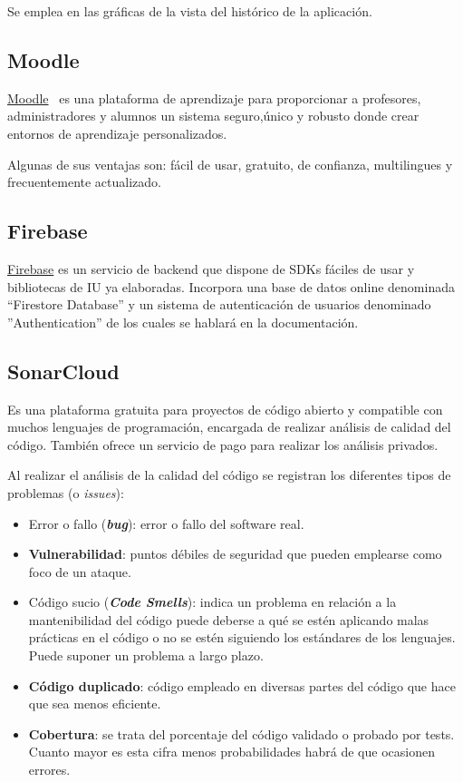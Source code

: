 Se emplea en las gráficas de la vista del histórico de la aplicación.

\subsection{Moodle}
\href{https://moodle.org/}{Moodle}~\cite{pagina_Moodle} es una plataforma de aprendizaje para proporcionar a profesores, administradores y alumnos un sistema seguro,único y robusto donde crear entornos de aprendizaje personalizados.

Algunas de sus ventajas son: fácil de usar, gratuito, de confianza, multilingues y frecuentemente actualizado.

\subsection{Firebase}
\href{https://firebase.google.com/}{Firebase} es un servicio de backend que dispone de SDKs fáciles de usar y bibliotecas de IU ya elaboradas. 
Incorpora una base de datos online denominada ``Firestore Database'' y un sistema de autenticación de usuarios denominado ''Authentication'' de los cuales se hablará en la documentación.

\subsection{SonarCloud}
Es una plataforma gratuita para proyectos de código abierto y compatible con muchos lenguajes de programación, encargada de realizar análisis de calidad del código. También ofrece un servicio de pago para realizar los análisis privados.

Al realizar el análisis de la calidad del código se registran los diferentes tipos de problemas (o \emph{issues}):
\begin{itemize}
	\tightlist
	\item Error o fallo (\textbf{\emph{bug}}): error o fallo del software real.   
	\item \textbf{Vulnerabilidad}: puntos débiles de seguridad que pueden emplearse como foco de un ataque.
	\item Código sucio (\textbf{\emph{Code Smells}}): indica un problema en relación a la mantenibilidad del código puede deberse a qué se estén aplicando malas prácticas en el código o no se estén siguiendo los estándares de los lenguajes. Puede suponer un problema a largo plazo.
	\item \textbf{Código duplicado}: código empleado en diversas partes del código que hace que sea menos eficiente.
	\item \textbf{Cobertura}: se trata del porcentaje del código validado o probado por tests. Cuanto mayor es esta cifra menos probabilidades habrá de que ocasionen errores.	
\end{itemize}

